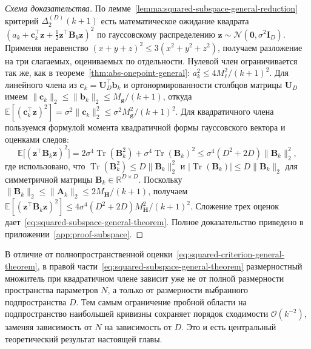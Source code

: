 \begin{proof}[Схема доказательства]
    По лемме~\ref{lemma:squared-subspace-general-reduction} критерий $\Delta_2^{(D)}(k+1)$ есть математическое ожидание квадрата $(a_k+\mathbf c_k^\top \mathbf z+\tfrac12 \mathbf z^\top \mathbf B_k \mathbf z)^2$ по гауссовскому распределению $\mathbf z \sim \mathcal N(\mathbf 0,\sigma^2 \mathbf I_D)$. Применяя неравенство $(x+y+z)^2 \leqslant 3(x^2+y^2+z^2)$, получаем разложение на три слагаемых, оцениваемых по отдельности. Нулевой член ограничивается так же, как в теореме~\ref{thm:abs-onepoint-general}: $a_k^2 \leqslant 4M_\ell^2/(k+1)^2$. Для линейного члена из $\mathbf c_k=\mathbf U_D^\top \mathbf b_k$ и ортонормированности столбцов матрицы $\mathbf U_D$ имеем $\|\mathbf c_k\|_2 \leqslant \|\mathbf b_k\|_2 \leqslant M_{\mathbf g}/(k+1)$, откуда $\mathbb E[(\mathbf c_k^\top \mathbf z)^2]=\sigma^2 \|\mathbf c_k\|_2^2 \leqslant \sigma^2 M_{\mathbf g}^2/(k+1)^2$. Для квадратичного члена пользуемся формулой момента квадратичной формы гауссовского вектора и оценками следов:
    \begin{equation}
        \mathbb E\big[(\mathbf z^\top \mathbf B_k \mathbf z)^2\big]
        =
        2\sigma^4 \operatorname{Tr}(\mathbf B_k^2) + \sigma^4 \operatorname{Tr}(\mathbf B_k)^2
        \leqslant \sigma^4(D^2+2D)\|\mathbf B_k\|_2^2,
    \end{equation}
    где использовано, что $\operatorname{Tr}(\mathbf B_k^2) \leqslant D\|\mathbf B_k\|_2^2$ и $|\operatorname{Tr}(\mathbf B_k)| \leqslant D\|\mathbf B_k\|_2$ для симметричной матрицы $\mathbf B_k \in \mathbb R^{D\times D}$. Поскольку $\|\mathbf B_k\|_2 \leqslant \|\mathbf A_k\|_2 \leqslant 2M_{\mathbf H}/(k+1)$, получаем $\mathbb E[(\mathbf z^\top \mathbf B_k \mathbf z)^2] \leqslant 4\sigma^4(D^2+2D)M_{\mathbf H}^2/(k+1)^2$. Сложение трех оценок дает~\eqref{eq:squared-subspace-general-theorem}. Полное доказательство приведено в приложении~\ref{app:proof-subspace}.
\end{proof}

В отличие от полнопространственной оценки~\eqref{eq:squared-criterion-general-theorem}, в правой части~\eqref{eq:squared-subspace-general-theorem} размерностный множитель при квадратичном члене зависит уже не от полной размерности пространства параметров $N$, а только от размерности выбранного подпространства $D$. Тем самым ограничение пробной области на подпространство наибольшей кривизны сохраняет порядок сходимости $\mathcal O(k^{-2})$, заменяя зависимость от $N$ на зависимость от $D$. Это и есть центральный теоретический результат настоящей главы.

